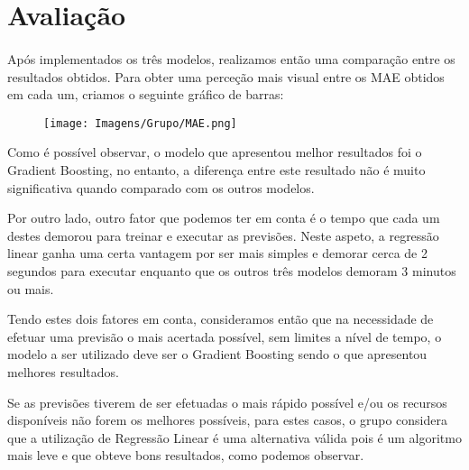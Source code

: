 \section{Avaliação}
\paragraph{}
Após implementados os três modelos, realizamos então uma comparação entre os resultados obtidos.
Para obter uma perceção mais visual entre os MAE obtidos em cada um, criamos o seguinte gráfico de barras:

\begin{figure}[H]
    \centering
    \centerline{\texttt{[image: Imagens/Grupo/MAE.png]}}
    \label{fig: MAE}
\end{figure}

Como é possível observar, o modelo que apresentou melhor resultados foi o Gradient Boosting, no entanto, a diferença entre este resultado não é muito significativa quando comparado com os outros modelos.

Por outro lado, outro fator que podemos ter em conta é o tempo que cada um destes demorou para treinar e executar as previsões. Neste aspeto, a regressão linear ganha uma certa vantagem por ser mais simples e demorar cerca de 2 segundos para executar enquanto que os outros três modelos demoram 3 minutos ou mais.

Tendo estes dois fatores em conta, consideramos então que na necessidade de efetuar uma previsão o mais acertada possível, sem limites a nível de tempo, o modelo a ser utilizado deve ser o Gradient Boosting sendo o que apresentou melhores resultados.

Se as previsões tiverem de ser efetuadas o mais rápido possível e/ou os recursos disponíveis não forem os melhores possíveis, para estes casos, o grupo considera que a utilização de Regressão Linear é uma alternativa válida pois é um algoritmo mais leve e que obteve bons resultados, como podemos observar.
